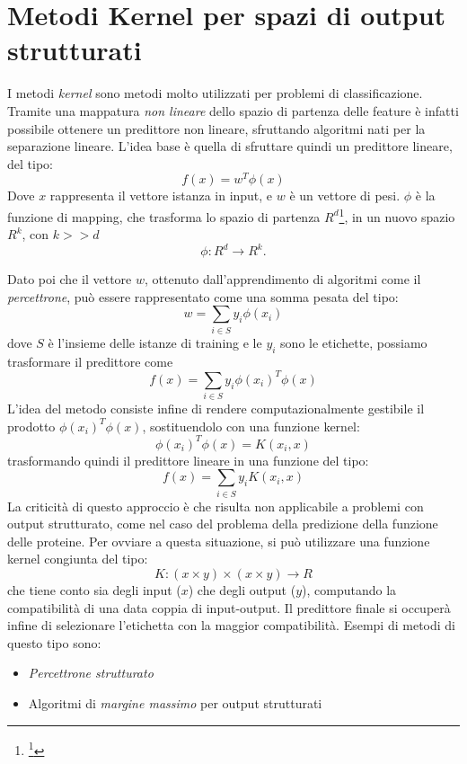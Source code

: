 \documentclass[12pt]{report}
\begin{document}
\section{Metodi Kernel per spazi di output strutturati}
I metodi \emph{kernel} sono metodi molto utilizzati per problemi di classificazione. Tramite una mappatura \emph{non lineare} dello spazio di partenza delle feature è infatti possibile ottenere un predittore non lineare, sfruttando algoritmi nati per la separazione lineare. L'idea base è quella di sfruttare quindi un predittore lineare, del tipo:
\[
f(x) = w^T \phi(x)
\]
Dove $x$ rappresenta il vettore istanza in input, e $w$ è un vettore di pesi. $\phi$ è la funzione di mapping, che trasforma lo spazio di partenza $R^d$\footnote{\footnote{Dove $d$ è il numero di feature dello spazio di partenza.}}, in un nuovo spazio $R^k$, con $k>>d$
\[
\phi : R^d \rightarrow R^k.
\]

Dato poi che il vettore $w$, ottenuto dall'apprendimento di algoritmi come il \emph{percettrone}\cite{PERC}, può essere rappresentato come una somma pesata del tipo:
\[
w = \sum_{i \in S} y_i \phi(x_i)
\]
dove $S$ è l'insieme delle istanze di training e le $y_i$ sono le etichette, possiamo trasformare il predittore come
\[
f(x) = \sum_{i\in S} y_i \phi(x_i)^T \phi(x)
\]
L'idea del metodo consiste infine di rendere computazionalmente gestibile il prodotto $\phi(x_i)^T \phi(x)$, sostituendolo con una funzione kernel:
\[
\phi(x_i)^T \phi(x) = K(x_i, x)
\]
trasformando quindi il predittore lineare in una funzione del tipo:
\[
f(x) = \sum_{i \in S} y_i K(x_i, x)
\]
La criticità di questo approccio è che risulta non applicabile a problemi con output strutturato, come nel caso del problema della predizione della funzione delle proteine. Per ovviare a questa situazione, si può utilizzare una funzione kernel congiunta del tipo:
\[
K : (x \times y) \times (x \times y) \rightarrow R
\]
che tiene conto sia degli input ($x$) che degli output ($y$), computando la compatibilità di una data coppia di input-output. Il predittore finale si occuperà infine di selezionare l'etichetta con la maggior compatibilità.
\newline
\newline
Esempi di metodi di questo tipo sono:
\begin{itemize}
\item \emph{Percettrone strutturato} \cite{perceptron}
\item Algoritmi di \emph{margine massimo} per output strutturati \cite{marginemassimo}
\end{itemize}
\end{document}
